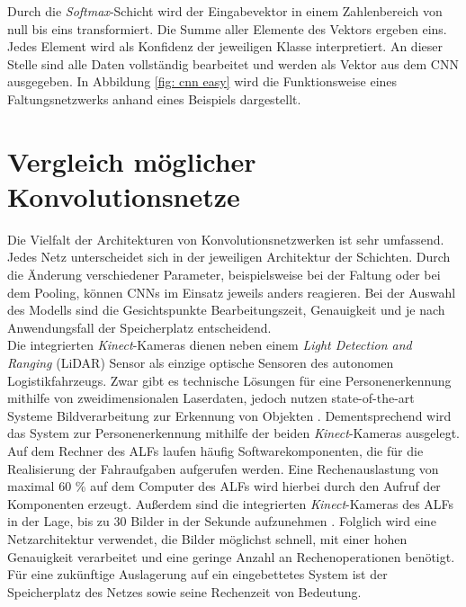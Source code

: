 		Durch die \textit{Softmax}-Schicht wird der Eingabevektor in einem Zahlenbereich von null bis eins transformiert. Die Summe aller Elemente des Vektors ergeben eins. Jedes Element wird als Konfidenz der jeweiligen Klasse interpretiert. An dieser Stelle sind alle Daten vollständig bearbeitet und werden als Vektor aus dem CNN ausgegeben. In Abbildung \ref{fig: cnn easy} wird die Funktionsweise eines Faltungsnetzwerks anhand eines Beispiels dargestellt.\\
		
		\section{Vergleich möglicher Konvolutionsnetze}
		\label{sec: cnns}
		Die Vielfalt der Architekturen von Konvolutionsnetzwerken ist sehr umfassend. Jedes Netz unterscheidet sich in der jeweiligen Architektur der Schichten. Durch die Änderung verschiedener Parameter, beispielsweise bei der Faltung oder bei dem Pooling, können CNNs im Einsatz jeweils anders reagieren. Bei der Auswahl des Modells sind die Gesichtspunkte Bearbeitungszeit, Genauigkeit und je nach Anwendungsfall der Speicherplatz entscheidend.\\
		
		Die integrierten \textit{Kinect}-Kameras dienen neben einem \textit{Light Detection and Ranging} (LiDAR) Sensor als einzige optische Sensoren des autonomen Logistikfahrzeugs. Zwar gibt es technische Lösungen für eine Personenerkennung mithilfe von zweidimensionalen Laserdaten, jedoch nutzen state-of-the-art Systeme Bildverarbeitung zur Erkennung von Objekten \cite{mobilenets, hogsvm}. Dementsprechend wird das System zur Personenerkennung mithilfe der beiden \textit{Kinect}-Kameras ausgelegt.\\
		
		Auf dem Rechner des ALFs laufen häufig Softwarekomponenten, die für die Realisierung der Fahraufgaben aufgerufen werden. Eine Rechenauslastung  von maximal 60 \% auf dem Computer des ALFs wird hierbei durch den Aufruf der Komponenten erzeugt. Außerdem sind die integrierten \textit{Kinect}-Kameras des ALFs in der Lage, bis zu 30 Bilder in der Sekunde aufzunehmen \cite{Bachelorarbeit}. Folglich wird eine Netzarchitektur verwendet, die Bilder möglichst schnell, mit einer hohen Genauigkeit verarbeitet und eine geringe Anzahl an Rechenoperationen benötigt. Für eine zukünftige Auslagerung auf ein eingebettetes System ist der Speicherplatz des Netzes sowie seine Rechenzeit von Bedeutung.\\
		
